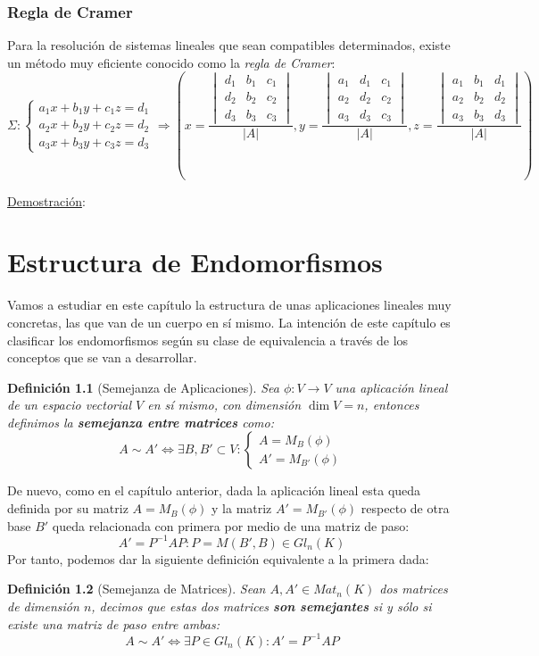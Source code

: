 \documentclass[10pt,a4paper,openright]{book}
\theoremstyle{break}
\newtheorem*{defi}{Definición}
\begin{document}
\subsection{Regla de Cramer}
Para la resolución de sistemas lineales que sean compatibles determinados, existe un método muy eficiente conocido como la \textit{regla de Cramer}:
$$\Sigma:\begin{cases}a_1x+b_1y+c_1z=d_1 \\ a_2x+b_2y+c_2z=d_2 \\ a_3x+b_3y+c_3z=d_3 \end{cases}\Rightarrow \left( x=\frac{\begin{vmatrix} d_1 & b_1 & c_1 \\ d_2 & b_2 & c_2 \\ d_3 & b_3 & c_3 \end{vmatrix}}{|A|}, y=\frac{\begin{vmatrix} a_1 & d_1 & c_1 \\ a_2 & d_2 & c_2 \\ a_3 & d_3 & c_3 \end{vmatrix}}{|A|}, z=\frac{\begin{vmatrix} a_1 & b_1 & d_1 \\ a_2 & b_2 & d_2 \\ a_3 & b_3 & d_3 \end{vmatrix}}{|A|} \right)$$

\underline{Demostración}:

\chapter{Estructura de Endomorfismos}
Vamos a estudiar en este capítulo la estructura de unas aplicaciones lineales muy concretas, las que van de un cuerpo en sí mismo. La intención de este capítulo es clasificar los endomorfismos según su clase de equivalencia a través de los conceptos que se van a desarrollar.

\begin{defi}[Semejanza de Aplicaciones]
Sea $\phi: V\rightarrow V$ una aplicación lineal de un espacio vectorial $V$ en sí mismo, con dimensión $\dim V = n$, entonces definimos la \textbf{semejanza entre matrices} como:
$$A\sim A' \Leftrightarrow \exists B, B'\subset V : \begin{cases}
A=M_{B}(\phi) \\ A'=M_{B'}(\phi) \end{cases}$$
\end{defi}
De nuevo, como en el capítulo anterior, dada la aplicación lineal esta queda definida por su matriz $A=M_B(\phi)$ y la matriz $A'=M_{B'}(\phi)$ respecto de otra base $B'$ queda relacionada con primera por medio de una matriz de paso:
$$A'= P^{-1}AP: P=M(B',B)\in Gl_n(K)$$
Por tanto, podemos dar la siguiente definición equivalente a la primera dada:
\begin{defi}[Semejanza de Matrices]
Sean $A,A'\in Mat_{n}(K)$ dos matrices de dimensión $n$, decimos que estas dos matrices \textbf{son semejantes} si y sólo si existe una matriz de paso entre ambas:
$$A\sim A' \Leftrightarrow \exists P \in Gl_n(K) : A' = P^{-1}AP$$
\end{defi}
\end{document}
